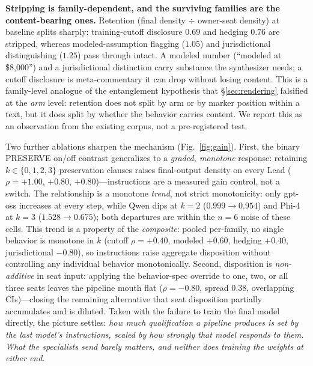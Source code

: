 \documentclass[11pt]{article}
\begin{document}
\textbf{Stripping is family-dependent, and the surviving families are the
content-bearing ones.} Retention (final density $\div$ owner-seat density) at
baseline splits sharply: training-cutoff disclosure $0.69$ and hedging $0.76$
are stripped, whereas modeled-assumption flagging ($1.05$) and jurisdictional
distinguishing ($1.25$) pass through intact. A modeled number (``modeled at
\$8{,}000'') and a jurisdictional distinction carry substance the synthesizer
needs; a cutoff disclosure is meta-commentary it can drop without losing
content. This is a family-level analogue of the entanglement hypothesis that
\S\ref{sec:rendering} falsified at the \emph{arm} level: retention does not
split by arm or by marker position within a text, but it does split by whether
the behavior carries content. We report this as an observation from the
existing corpus, not a pre-registered test.

Two further ablations sharpen the mechanism (Fig.~\ref{fig:gain}). First, the
binary PRESERVE on/off contrast generalizes to a \emph{graded, monotone}
response: retaining $k \in \{0,1,2,3\}$ preservation clauses raises
final-output density on every Lead ($\rho=+1.00$, $+0.80$, $+0.80$)---instructions
are a measured gain control, not a switch. The relationship is a monotone
\emph{trend}, not strict monotonicity: only gpt-oss increases at every step,
while Qwen dips at $k{=}2$ ($0.999 \rightarrow 0.954$) and Phi-4 at $k{=}3$
($1.528 \rightarrow 0.675$); both departures are within the $n{=}6$ noise of
these cells. This trend is a property of the
\emph{composite}: pooled per-family, no single behavior is monotone in $k$
(cutoff $\rho=+0.40$, modeled $+0.60$, hedging $+0.40$, jurisdictional
$-0.80$), so instructions raise aggregate disposition without controlling any
individual behavior monotonically. Second, disposition is \emph{non-additive} in seat
input: applying the behavior-spec override to one, two, or all three seats
leaves the pipeline mouth flat ($\rho=-0.80$, spread $0.38$, overlapping
CIs)---closing the remaining alternative that seat disposition partially
accumulates and is diluted. Taken with the failure to train the final model directly, the picture
settles: \emph{how much qualification a pipeline produces is set by the last
model's instructions, scaled by how strongly that model responds to them.
What the specialists send barely matters, and neither does training the
weights at either end.}
\end{document}
